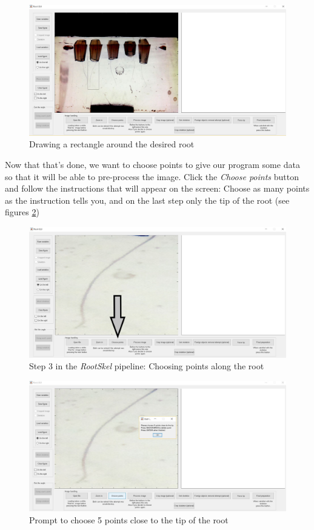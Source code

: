 \begin{figure}[H]
  	\centering
  	\includegraphics[width=\textwidth]{../Figures/manual/step5.jpg}
  	\caption{Drawing a rectangle around the desired root}
  	\label{fig:img8}
\end{figure}
  
Now that that's done, we want to choose points to give our program some data so that it will be able to pre-process the image.
Click the \textit{Choose points} button and follow the instructions that will appear on the screen: Choose as many points as the instruction tells you, and on the last step only the tip of the root (see figures \ref{fig:img9})

\begin{figure}[H]
	\centering
	\includegraphics[width=\textwidth]{../Figures/manual/step6.jpg}
	\caption{Step 3 in the \textit{RootSkel} pipeline: Choosing points along the root}
	\label{fig:img9}
\end{figure}

\begin{figure}[H]
	\centering
	\includegraphics[width=\textwidth]{../Figures/manual/step7.jpg}
	\caption{Prompt to choose 5 points close to the tip of the root}
	\label{fig:img10}
\end{figure}

